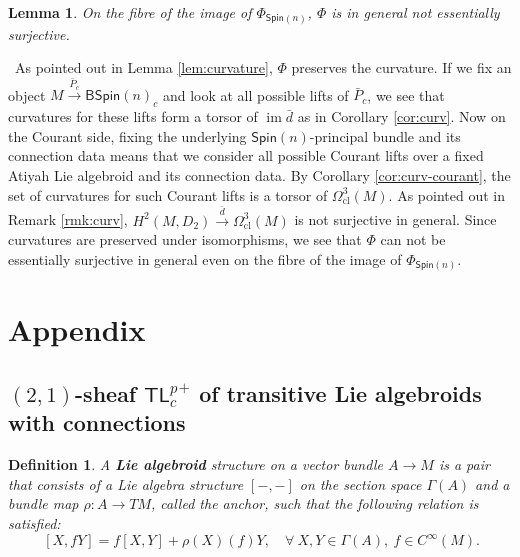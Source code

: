 \documentclass[letterpaper,10pt, oneside]{article} %
\newtheorem{lem}[thm]{Lemma}\newtheorem{lemma}[thm]{Lemma}
\newtheorem{rmk}[thm]{Remark}
\newtheorem{defi}[thm]{Definition}
\newcommand {\emptycomment}[1]{}
\newcommand{\tlp}{{\mathsf{TL}^{p}_{c}}} %
\newcommand{\Spin}{\mathsf{Spin}}%
\newcommand{\B}{\mathsf{B}}%
\DeclareMathOperator{\im}{im}
\newcommand{\cl}{\mathrm{cl}}
\newcommand{\pf}{\noindent{\bf Proof.}\ }
\newcommand{\CWM}{C^{\infty}(M)}
\def\qed{\hfill ~\vrule height6pt width6pt depth0pt}
\newcommand{\gl}{\mathfrak {gl}}
\begin{document}
\begin{lem}
On the fibre of the image of $\Phi_{\Spin(n)}$, $\Phi$ is in general not essentially surjective.
\end{lem}
\pf As pointed out in Lemma \ref{lem:curvature}, $\Phi$ preserves the curvature. If we fix an object $M\xrightarrow{\bar{P}_c} \B \Spin(n)_c$ and look at all possible lifts of $\bar{P}_c$, we see that curvatures for these lifts form a torsor of $\im \bar{d}$ as in Corollary \ref{cor:curv}. Now on the Courant side, fixing the underlying $\Spin(n)$-principal bundle and its connection data means that we consider all possible Courant lifts over a fixed Atiyah Lie algebroid and its connection data. By Corollary \ref{cor:curv-courant}, the set of curvatures for such Courant lifts is a torsor of $\Omega^3_{\cl}(M)$. As pointed out in Remark \ref{rmk:curv}, $H^2(M, D_2) \xrightarrow{\bar{d}} \Omega_{\cl}^3(M)$ is not surjective in general. Since curvatures are preserved under isomorphisms, we see that $\Phi$ can not be essentially surjective in general even on the fibre of the image of $\Phi_{\Spin(n)}$.
\qed

\emptycomment{
\begin{rmk}\label{}
We may extend our construction of $\Phi$ from $\Spin(n)$ to a general Lie group. Then the action Courant algebroid $M \times \gl(n)$ over the complete flag $M$,  studied in Example \ref{ep:action-courant},  stays in the image of $\Phi$. This is because $M\times \gl(n)$ is isomorphic to a standard transitive Courant algebroid, whose preimage under $\Phi$ can be a trivial string principal bundle with all connection forms ($\theta_i$, $A_i$, $B_{ij}$, and all $\omega^l$'s) 0, $g_{ij}=1$, and $f_{ijk}=1$.
\end{rmk}}


\appendix

\section{Appendix}\label{sec:app}

\subsection{$(2,1)$-sheaf $\tlp^+$ of transitive Lie algebroids with connections}\label{app:tl}
\begin{defi}
A {\bf Lie algebroid} structure on a vector bundle $ A\longrightarrow M$ is
a pair that consists of a Lie algebra structure $[-,-] $ on
the section space $\Gamma( A)$ and a  bundle map
$\rho: A\longrightarrow TM$, called the anchor, such that the
following relation is satisfied:
$$~[X,fY] =f[X,Y]+\rho(X)(f)Y,\quad \forall~X,Y\in\Gamma(A),~f\in
\CWM.$$
\end{defi}
\end{document}
